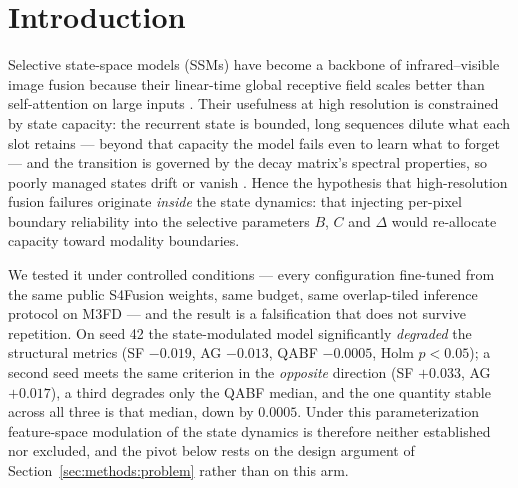 \documentclass[pdflatex,sn-mathphys-num]{sn-jnl}
\theoremstyle{thmstyleone}%
\theoremstyle{thmstyletwo}%
\theoremstyle{thmstylethree}%
\begin{document}

\maketitle

\section{Introduction}\label{sec:intro}

Selective state-space models (SSMs) have become a backbone of infrared--visible image fusion because their linear-time global receptive field scales better than self-attention on large inputs \cite{ma2025s4fusion,gu2023mamba}. Their usefulness at high resolution is constrained by state capacity: the recurrent state is bounded, long sequences dilute what each slot retains --- beyond that capacity the model fails even to learn what to forget \cite{chen2025stuffed} --- and the transition is governed by the decay matrix's spectral properties, so poorly managed states drift or vanish \cite{lu2025mambamodulation,ali2025hidden}. Hence the hypothesis that high-resolution fusion failures originate \emph{inside} the state dynamics: that injecting per-pixel boundary reliability into the selective parameters $B$, $C$ and $\Delta$ would re-allocate capacity toward modality boundaries.

We tested it under controlled conditions --- every configuration fine-tuned from the same public S4Fusion weights, same budget, same overlap-tiled inference protocol on M3FD \cite{liu2022tardal} --- and the result is a falsification that does not survive repetition. On seed 42 the state-modulated model significantly \emph{degraded} the structural metrics (SF $-0.019$, AG $-0.013$, QABF $-0.0005$, Holm $p < 0.05$); a second seed meets the same criterion in the \emph{opposite} direction (SF $+0.033$, AG $+0.017$), a third degrades only the QABF median, and the one quantity stable across all three is that median, down by $0.0005$. Under this parameterization feature-space modulation of the state dynamics is therefore neither established nor excluded, and the pivot below rests on the design argument of Section~\ref{sec:methods:problem} rather than on this arm.
\end{document}
